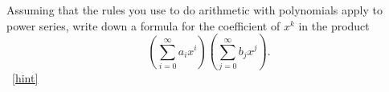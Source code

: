 \documentclass{book}
\begin{document}
\setcounter{project}{248}
\addtocounter{project}{-1}
\begin{activity}[]\label{coeffinpowerseries}
\hypertarget{p-1345}{}%
Assuming that the rules you use to do arithmetic with polynomials apply to power series, write down a formula for the coefficient of \(x^k\) in the product%
\begin{equation*}
\left(\sum_{i=0}^\infty a_ix^i\right)\left(\sum_{j=0}^\infty
b_jx^j\right)\text{.}
\end{equation*}
%
~\hfill{\tiny\hyperlink{a-248}{[hint]}\hypertarget{q-248}{}}\end{activity}
\end{document}
